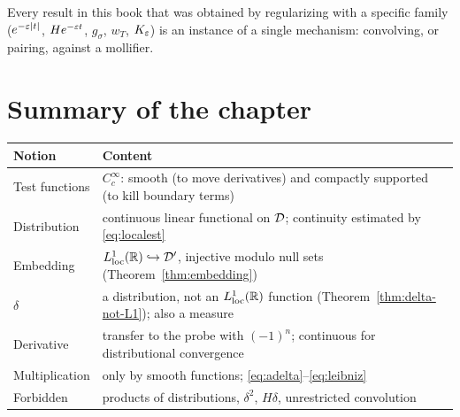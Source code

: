 \begin{corollary}\label{cor:approx}
Every result in this book that was obtained by regularizing with a specific family
($e^{-\varepsilon|t|}$, $H e^{-\varepsilon t}$, $g_{\sigma}$, $w_{T}$, $K_{\varepsilon}$) is an instance of a single
mechanism: convolving, or pairing, against a mollifier.
\end{corollary}

\section{Summary of the chapter}

\begin{center}
\small
\begin{tabular}{@{}p{3.4cm}p{9.4cm}@{}}
\toprule
Notion & Content \\
\midrule
Test functions & $C_{c}^{\infty}$: smooth (to move derivatives) and compactly supported (to kill
boundary terms) \\
Distribution & continuous linear functional on $\mathcal{D}$; continuity estimated by
\eqref{eq:localest} \\
Embedding & $L^{1}_{\mathrm{loc}}(\mathbb{R})\hookrightarrow\mathcal{D}'$, injective modulo null sets
(Theorem~\ref{thm:embedding}) \\
$\delta$ & a distribution, not an $L^{1}_{\mathrm{loc}}(\mathbb{R})$ function
(Theorem~\ref{thm:delta-not-L1}); also a measure \\
Derivative & transfer to the probe with $(-1)^{n}$; continuous for distributional convergence \\
Multiplication & only by smooth functions; \eqref{eq:adelta}--\eqref{eq:leibniz} \\
Forbidden & products of distributions, $\delta^{2}$, $H\delta$, unrestricted convolution \\
\bottomrule
\end{tabular}
\end{center}
